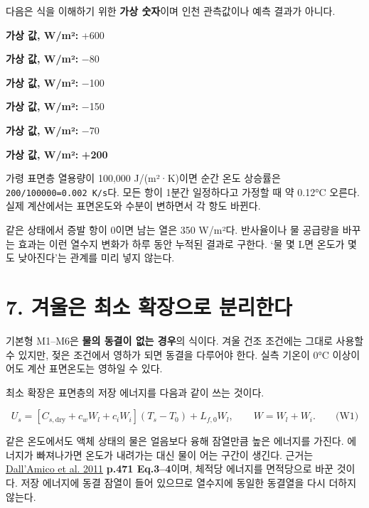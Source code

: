 \documentclass[11pt,a4paper]{article}
\begin{document}
다음은 식을 이해하기 위한 \textbf{가상 숫자}이며 인천 관측값이나 예측 결과가 아니다.

\begin{description}[leftmargin=0pt,style=nextline]
\item[흡수한 햇빛] \textbf{가상 값, W/m²:} +600
\item[순열복사] \textbf{가상 값, W/m²:} −80
\item[공기로 전달한 열] \textbf{가상 값, W/m²:} −100
\item[증발에 쓴 열] \textbf{가상 값, W/m²:} −150
\item[내부로 전달한 열] \textbf{가상 값, W/m²:} −70
\item[표면에 남는 열] \textbf{가상 값, W/m²:} \textbf{+200}
\end{description}

가령 표면층 열용량이 100,000 J/(m²·K)이면 순간 온도 상승률은 \texttt{200/100000=0.002 K/s}다. 모든 항이 1분간 일정하다고 가정할 때 약 0.12°C 오른다. 실제 계산에서는 표면온도와 수분이 변하면서 각 항도 바뀐다.

같은 상태에서 증발 항이 0이면 남는 열은 350 W/m²다. 반사율이나 물 공급량을 바꾸는 효과는 이런 열수지 변화가 하루 동안 누적된 결과로 구한다. ‘물 몇 L면 온도가 몇 도 낮아진다’는 관계를 미리 넣지 않는다.

\section{7. 겨울은 최소 확장으로 분리한다}

기본형 M1–M6은 \textbf{물의 동결이 없는 경우}의 식이다. 겨울 건조 조건에는 그대로 사용할 수 있지만, 젖은 조건에서 영하가 되면 동결을 다루어야 한다. 실측 기온이 0°C 이상이어도 계산 표면온도는 영하일 수 있다.

최소 확장은 표면층의 저장 에너지를 다음과 같이 쓰는 것이다.

\begin{equation*}
U_s=[C_{s,\mathrm{dry}}+c_wW_l+c_iW_i](T_s-T_0)+L_{f,0}W_l,
\qquad W=W_l+W_i.\qquad\text{(W1)}
\end{equation*}

같은 온도에서도 액체 상태의 물은 얼음보다 융해 잠열만큼 높은 에너지를 가진다. 에너지가 빠져나가면 온도가 내려가는 대신 물이 어는 구간이 생긴다. 근거는 \href{\detokenize{https://tc.copernicus.org/articles/5/469/2011/tc-5-469-2011.pdf}}{Dall'Amico et al. 2011} \textbf{p.471 Eq.3–4}이며, 체적당 에너지를 면적당으로 바꾼 것이다. 저장 에너지에 동결 잠열이 들어 있으므로 열수지에 동일한 동결열을 다시 더하지 않는다.
\end{document}
